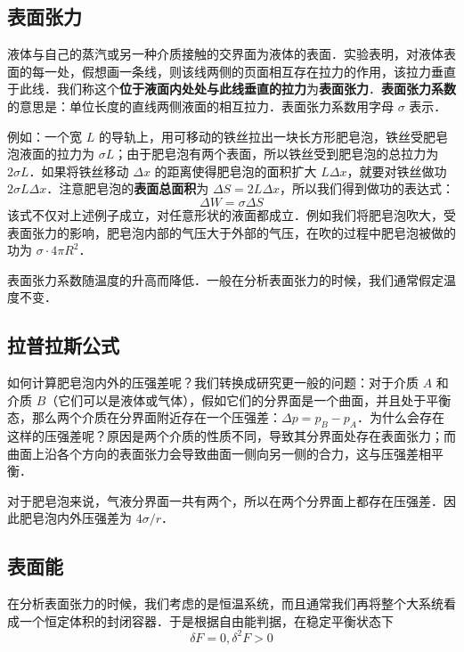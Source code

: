 

\subsection{表面张力}

液体与自己的蒸汽或另一种介质接触的交界面为液体的表面．实验表明，对液体表面的每一处，假想画一条线，则该线两侧的页面相互存在拉力的作用，该拉力垂直于此线．我们称这个\textbf{位于液面内处处与此线垂直的拉力}为\textbf{表面张力}．\textbf{表面张力系数} 的意思是：单位长度的直线两侧液面的相互拉力．表面张力系数用字母 $\sigma$ 表示．

例如：一个宽 $L$ 的导轨上，用可移动的铁丝拉出一块长方形肥皂泡，铁丝受肥皂泡液面的拉力为 $\sigma L$；由于肥皂泡有两个表面，所以铁丝受到肥皂泡的总拉力为 $2\sigma L$．如果将铁丝移动 $\Delta x$ 的距离使得肥皂泡的面积扩大 $L\Delta x$，就要对铁丝做功 $2\sigma L\Delta x$．注意肥皂泡的\textbf{表面总面积}为 $\Delta S=2 L \Delta x$，所以我们得到做功的表达式：
\begin{equation}
\Delta W=\sigma \Delta S
\end{equation}
该式不仅对上述例子成立，对任意形状的液面都成立．例如我们将肥皂泡吹大，受表面张力的影响，肥皂泡内部的气压大于外部的气压，在吹的过程中肥皂泡被做的功为 $\sigma\cdot 4\pi R^2$．

表面张力系数随温度的升高而降低．一般在分析表面张力的时候，我们通常假定温度不变．

\subsection{拉普拉斯公式}
如何计算肥皂泡内外的压强差呢？我们转换成研究更一般的问题：对于介质 $A$ 和介质 $B$（它们可以是液体或气体），假如它们的分界面是一个曲面，并且处于平衡态，那么两个介质在分界面附近存在一个压强差：$\Delta p=p_B-p_A$．为什么会存在这样的压强差呢？原因是两个介质的性质不同，导致其分界面处存在表面张力；而曲面上沿各个方向的表面张力会导致曲面一侧向另一侧的合力，这与压强差相平衡．

对于肥皂泡来说，气液分界面一共有两个，所以在两个分界面上都存在压强差．因此肥皂泡内外压强差为 $4\sigma/r$．

\subsection{表面能}

在分析表面张力的时候，我们考虑的是恒温系统，而且通常我们再将整个大系统看成一个恒定体积的封闭容器．于是根据自由能判据，在稳定平衡状态下
\begin{equation}
\delta F=0,\delta^2 F>0
\end{equation}

